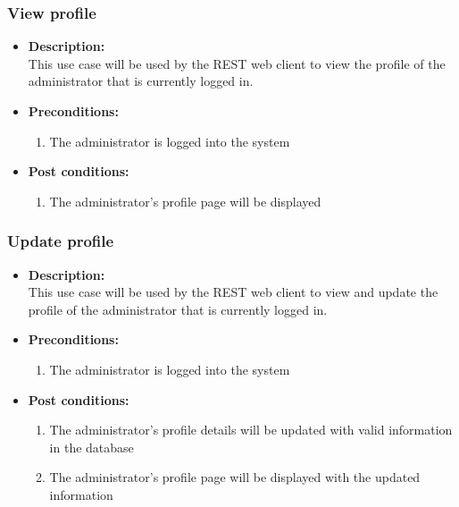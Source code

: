 \documentclass[a4paper,10pt]{article}
\begin{document}
\subsubsection{View profile}
\begin{itemize}
	\item \textbf {Description:}\\
	This use case will be used by the REST web client to view the profile of the administrator that is currently logged in.
	\item \textbf {Preconditions:}
		\begin{enumerate}
			\item The administrator is logged into the system
		\end{enumerate}
	\item \textbf {Post conditions:}
		\begin{enumerate}
			\item The administrator’s profile page will be displayed
		\end{enumerate}
\end{itemize}
\subsubsection{Update  profile}
\begin{itemize}
	\item \textbf {Description:}\\
	This use case will be used by the REST web client to view and update the profile of the administrator that is currently logged in.
	\item \textbf {Preconditions:}
		\begin{enumerate}
			\item The administrator is logged into the system
		\end{enumerate}
	\item \textbf {Post conditions:}
		\begin{enumerate}
			\item The administrator’s profile details will be updated with valid information in the database
			\item The administrator’s profile page will be displayed with the updated information
		\end{enumerate}
\end{itemize}
\end{document}
